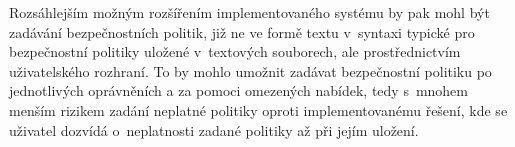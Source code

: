 Rozsáhlejším možným rozšířením implementovaného systému by pak mohl být zadávání bezpečnostních politik, již ne ve formě textu v~syntaxi typické pro bezpečnostní politiky uložené v~textových souborech, ale prostřednictvím uživatelského rozhraní.
To by mohlo umožnit zadávat bezpečnostní politiku po jednotlivých oprávněních a za pomoci omezených nabídek, tedy s~mnohem menším rizikem zadání neplatné politiky oproti implementovanému řešení, kde se uživatel dozvídá o~neplatnosti zadané politiky až při jejím uložení.

